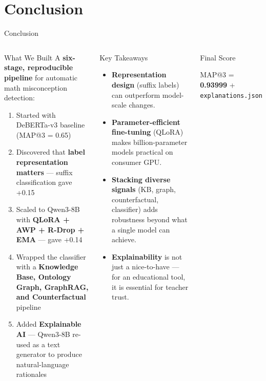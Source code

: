 ﻿\documentclass[aspectratio=169,10pt]{beamer}
\begin{document}
\section{Conclusion}

\begin{frame}[shrink=4]{Conclusion}
\begin{columns}[T]
\begin{block}{What We Built}
A \textbf{six-stage, reproducible pipeline} for automatic math misconception detection:
\begin{enumerate}
  \item Started with DeBERTa-v3 baseline (MAP@3 = 0.65)
  \item Discovered that \textbf{label representation matters} --- suffix classification gave +0.15
  \item Scaled to Qwen3-8B with \textbf{QLoRA + AWP + R-Drop + EMA} --- gave +0.14
  \item Wrapped the classifier with a \textbf{Knowledge Base, Ontology Graph, GraphRAG, and Counterfactual} pipeline
  \item Added \textbf{Explainable AI} --- Qwen3-8B re-used as a text generator to produce natural-language rationales
\end{enumerate}
\end{block}
\begin{block}{Key Takeaways}
\begin{itemize}
  \item \textbf{Representation design} (suffix labels) can outperform model-scale changes.
  \item \textbf{Parameter-efficient fine-tuning} (QLoRA) makes billion-parameter models practical on consumer GPU.
  \item \textbf{Stacking diverse signals} (KB, graph, counterfactual, classifier) adds robustness beyond what a single model can achieve.
  \item \textbf{Explainability} is not just a nice-to-have --- for an educational tool, it is essential for teacher trust.
\end{itemize}
\end{block}
\vspace{6pt}
\begin{exampleblock}{Final Score}
\begin{center}
\Large MAP@3 = \textbf{0.93999} \quad + \texttt{explanations.json}
\end{center}
\end{exampleblock}
\end{columns}
\end{frame}
\end{document}
